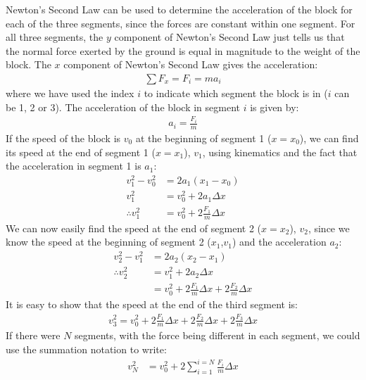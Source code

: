 
Newton's Second Law can be used to determine the acceleration of the block for each of the three segments, since the forces are constant within one segment. For all three segments, the $y$ component of Newton's Second Law just tells us that the normal force exerted by the ground is equal in magnitude to the weight of the block. The $x$ component of Newton's Second Law gives the acceleration:
\begin{align*}
\sum F_x = F_i = ma_i
\end{align*}
where we have used the index $i$ to indicate which segment the block is in ($i$ can be 1, 2 or 3). The acceleration of the block in segment $i$ is given by:
\begin{align*}
a_i = \frac{F_i}{m}
\end{align*}
If the speed of the block is $v_0$ at the beginning of segment 1 ($x=x_0$), we can find its speed at the end of segment 1 ($x=x_1$), $v_1$, using kinematics and the fact that the acceleration in segment 1 is $a_1$:
\begin{align*}
v_1^2-v_0^2 &= 2a_1(x_1 - x_0)\\
v_1^2 &=v_0^2+ 2a_1\Delta x\\
\therefore v_1^2 &=v_0^2+2\frac{F_1}{m}\Delta x
\end{align*}
We can now easily find the speed at the end of segment 2 ($x=x_2$), $v_2$, since we know the speed at the beginning of segment 2 ($x_1$,$v_1$) and the acceleration $a_2$:
\begin{align*}
v_2^2 -v_1^2 &= 2a_2(x_2 - x_1)\\
\therefore v_2^2 &= v_1^2 + 2a_2\Delta x\\
&=v_0^2+ 2\frac{F_1}{m}\Delta x + 2\frac{F_2}{m}\Delta x
\end{align*}
It is easy to show that the speed at the end of the third segment is:
\begin{align*}
v_3^2 = v_0^2+ 2\frac{F_1}{m}\Delta x + 2\frac{F_2}{m}\Delta x +2\frac{F_3}{m}\Delta x
\end{align*}
If there were $N$ segments, with the force being different in each segment, we could use the summation notation to write:
\begin{align*}
v_N^2 &= v_0^2 + 2\sum_{i=1}^{i=N} \frac{F_i}{m}\Delta x
\end{align*}

